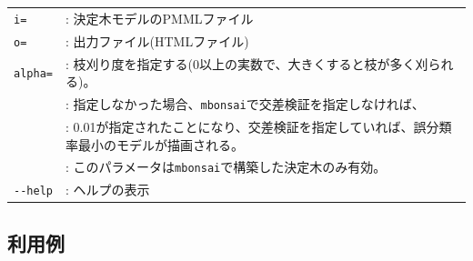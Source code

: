 \begin{table}[htbp]
{\small
\begin{tabular}{ll}
\verb|i=| & : 決定木モデルのPMMLファイル \\
\verb|o=| & : 出力ファイル(HTMLファイル) \\
\verb|alpha=| & : 枝刈り度を指定する(0以上の実数で、大きくすると枝が多く刈られる)。 \\
              & : 指定しなかった場合、\verb|mbonsai|で交差検証を指定しなければ、\\
              & : 0.01が指定されたことになり、交差検証を指定していれば、誤分類率最小のモデルが描画される。\\
              & : このパラメータは\verb|mbonsai|で構築した決定木のみ有効。\\
\verb|--help| & : ヘルプの表示 \\
\end{tabular} 
}
\end{table} 

\subsection{利用例}


%

